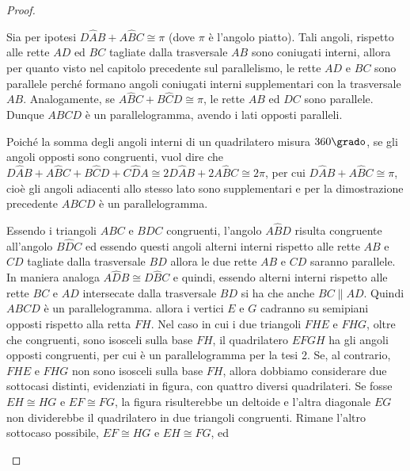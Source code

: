 \begin{proof}~\\
	\begin{enumerate*}
		\item Sia per ipotesi $D\widehat{A}B+A\widehat{B}C\cong \pi$ (dove 
		$\pi$ è l'angolo piatto). Tali angoli, rispetto alle rette $AD$ ed 
		$BC$ tagliate dalla trasversale $AB$ sono coniugati interni, allora 
		per quanto visto nel capitolo precedente sul parallelismo, le rette 
		$AD$ e $BC$ sono parallele perché formano angoli coniugati interni 
		supplementari con la trasversale $AB$. Analogamente, se 
		$A\widehat{B}C+B\widehat{C}D\cong \pi$, le rette $AB$ ed $DC$ sono 
		parallele. Dunque $ABCD$ è un parallelogramma, avendo i lati opposti 
		paralleli.
		\item Poiché la somma degli angoli interni di un quadrilatero misura 
		$360\grado$, se gli angoli opposti sono congruenti, vuol dire che 
		$D\widehat{A}B+A\widehat{B}C+B\widehat{C}D+C\widehat{D}A\cong 
		2D\widehat{A}B+2A\widehat{B}C\cong 2\pi$, per cui 
		$D\widehat{A}B+A\widehat{B}C\cong\pi$, cioè gli angoli adiacenti allo 
		stesso lato sono supplementari e per la dimostrazione precedente 
		$ABCD$ è un parallelogramma.
		\item Essendo i triangoli $ABC$ e $BDC$ congruenti, l'angolo 
		$A\widehat{B}D$ risulta congruente all'angolo $B\widehat{D}C$ ed 
		essendo questi angoli alterni interni rispetto alle rette $AB$ e $CD$ 
		tagliate dalla trasversale $BD$ allora le due rette $AB$ e $CD$ 
		saranno parallele. In maniera analoga $A\widehat{D}B\cong 
		D\widehat{B}C$ e quindi, essendo alterni interni rispetto alle rette 
		$BC$ e $AD$ intersecate dalla trasversale $BD$ si ha che anche 
		$BC\parallel AD$. Quindi $ABCD$ è un parallelogramma.
		allora i vertici $E$ e $G$ cadranno su semipiani opposti rispetto 
		alla retta $FH$. Nel caso in cui i due triangoli $FHE$ e $FHG$, oltre 
		che congruenti, sono isosceli sulla base $FH$, il quadrilatero $EFGH$ 
		ha gli angoli opposti congruenti, per cui è un parallelogramma per la 
		tesi 2. Se, al contrario, $FHE$ e $FHG$ non sono isosceli sulla base 
		$FH$, allora dobbiamo considerare due sottocasi distinti, evidenziati 
		in figura, con quattro diversi quadrilateri. Se fosse $EH\cong HG$ e 
		$EF\cong FG$, la figura risulterebbe un deltoide e l'altra diagonale 
		$EG$ non dividerebbe il quadrilatero in due triangoli congruenti. 
		Rimane l'altro sottocaso possibile, $EF\cong HG$ e $EH\cong FG$, ed 

\end{enumerate*}
\end{proof}
